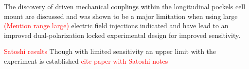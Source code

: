 The discovery of driven mechanical couplings within the longitudinal pockels cell mount are discussed and was shown to be a major limitation when using large \textcolor{red}{(Mention range large)} electric field injections indicated and have lead to an improved dual-polarization locked experimental design for improved sensitivity.


\textcolor{red}{Satoshi results}
Though with limited sensitivity an upper limit with the experiment is established \textcolor{red}{cite paper with Satoshi notes} 
